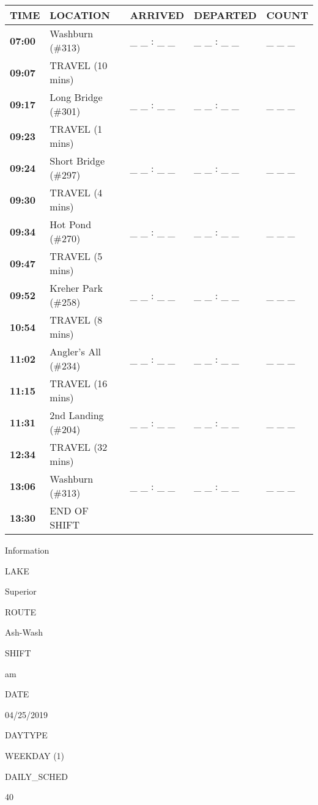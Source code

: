 \documentclass[]{article}
\begin{document}
\begin{tabular}{>{\bfseries}lllll}
\toprule
\textbf{TIME} & \textbf{LOCATION} & \textbf{ARRIVED} & \textbf{DEPARTED} & \textbf{COUNT}\\
\midrule
07:00 & Washburn (\#313) & \_ \_ : \_ \_ & \_ \_ : \_ \_ & \_ \_ \_\\
09:07 & TRAVEL (10 mins) &  &  & \\
09:17 & Long Bridge (\#301) & \_ \_ : \_ \_ & \_ \_ : \_ \_ & \_ \_ \_\\
09:23 & TRAVEL (1 mins) &  &  & \\
09:24 & Short Bridge (\#297) & \_ \_ : \_ \_ & \_ \_ : \_ \_ & \_ \_ \_\\
09:30 & TRAVEL (4 mins) &  &  & \\
09:34 & Hot Pond (\#270) & \_ \_ : \_ \_ & \_ \_ : \_ \_ & \_ \_ \_\\
09:47 & TRAVEL (5 mins) &  &  & \\
09:52 & Kreher Park (\#258) & \_ \_ : \_ \_ & \_ \_ : \_ \_ & \_ \_ \_\\
10:54 & TRAVEL (8 mins) &  &  & \\
11:02 & Angler's All (\#234) & \_ \_ : \_ \_ & \_ \_ : \_ \_ & \_ \_ \_\\
11:15 & TRAVEL (16 mins) &  &  & \\
11:31 & 2nd Landing (\#204) & \_ \_ : \_ \_ & \_ \_ : \_ \_ & \_ \_ \_\\
12:34 & TRAVEL (32 mins) &  &  & \\
13:06 & Washburn (\#313) & \_ \_ : \_ \_ & \_ \_ : \_ \_ & \_ \_ \_\\
13:30 & END OF SHIFT &  &  & \\
\bottomrule
\end{tabular}\newpage

Information

LAKE

Superior

ROUTE

Ash-Wash

SHIFT

am

DATE

04/25/2019

DAYTYPE

WEEKDAY (1)

DAILY\_SCHED

40

\vspace{24pt}
\end{document}
